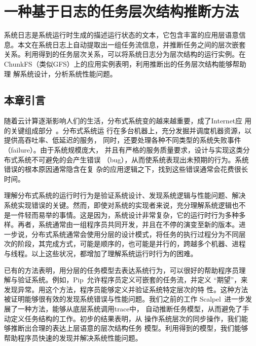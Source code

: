 \chapter{一种基于日志的任务层次结构推断方法}
\label{chap:logmining}

系统日志是系统运行时生成的描述运行状态的文本，它包含丰富的应用层语意信
息。本文在系统日志上自动提取出一组任务流信息，并推断任务之间的层次嵌套
关系。利用得到的任务层次关系，可以将系统日志分为层次结构的运行实例。在
ChunkFS（类似GFS）上的应用实例表明，利用推断出的任务层次结构能够帮助理
解系统设计，分析系统性能问题。

\section{本章引言}

随着云计算逐渐影响人们的生活，分布式系统变的越来越重要，成了Internet应
用的关键组成部分~\cite{gfs, mapreduce, bigtable, dynamo}。分布式系统运
行在多台机器上，充分发掘并调度机器资源，以提供高吞吐率、低延迟的服务，
同时，还要处理各种不同类型的系统失败事件（failure）。由于系统规模庞大，
并且有严格的服务质量要求，设计与实现这类分布式系统不可避免的会产生错误
（bug），从而使系统表现出未预期的行为。系统错误的根本原因通常隐含在复
杂的应用逻辑之下，找到这些错误通常会花费很长时间。

理解分布式系统的运行时行为是验证系统设计、发现系统逻辑与性能问题、解决
系统实现错误的关键。然而，即使对系统的实现者来说，充分理解系统逻辑也不
是一件轻而易举的事情。这是因为，系统设计非常复杂，它的运行时行为多种多
样。再者，系统通常由一组程序员共同开发，并且在不停的演变至新的版本。进
一步说，分布式系统通常会使用分层的设计模式，将任务的执行过程分为不同层
次的阶段，其完成方式，可能是顺序的，也可能是并行的，跨越多个机器、进程
与线程。以上这些状况，都增加了理解系统运行时行为的困难。

已有的方法表明，用分层的任务模型去表达系统行为，可以很好的帮助程序员理
解与验证系统。例如，Pip~\cite{pip}允许程序员定义可嵌套的任务流，并定义
“期望”，来发现异常。用这个方法，程序员能够定义并验证系统特定层次的特
性。这种方法被证明能够很有效的发现系统错误与性能问题。我们之前的工作
Scalpel~\cite{scalpel}进一步发展了一种方法，能够从底层系统调用trace中，
自动推断任务模型，从而避免了手动定义任务结构的工作。初步的结果表明，从
操作系统层次的同步操作，我们能够推断出合理的表达上层语意的层次结构任务
模型。利用得到的模型，我们能够帮助程序员快速的发现并解决系统性能问题。

